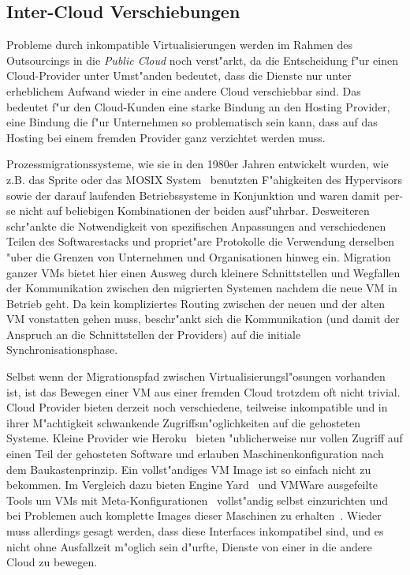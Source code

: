 \documentclass[draft,journal]{IEEEtran}
\begin{document}
\subsection{Inter-Cloud Verschiebungen}
\label{sec:movclouds}
Probleme durch inkompatible Virtualisierungen werden im Rahmen des
Outsourcings in die \emph{Public Cloud} noch verst"arkt, da die
Entscheidung f"ur einen Cloud-Provider unter Umst"anden bedeutet, dass
die Dienste nur unter erheblichem Aufwand wieder in eine andere Cloud
verschiebbar sind. Das bedeutet f"ur den Cloud-Kunden eine starke
Bindung an den Hosting Provider, eine Bindung die f"ur Unternehmen so
problematisch sein kann, dass auf das Hosting bei einem fremden
Provider ganz verzichtet werden muss.

Prozessmigrationssysteme, wie sie in den 1980er Jahren entwickelt
wurden, wie z.B. das Sprite oder das MOSIX
System~\cite{hansen2004self} benutzten F"ahigkeiten des Hypervisors
sowie der darauf laufenden Betriebssysteme in Konjunktion und waren
damit per-se nicht auf beliebigen Kombinationen der beiden
ausf"uhrbar. Desweiteren schr"ankte die Notwendigkeit von spezifischen
Anpassungen and verschiedenen Teilen des Softwarestacks und
propriet"are Protokolle die Verwendung derselben "uber die Grenzen von
Unternehmen und Organisationen hinweg ein. Migration ganzer VMs bietet
hier einen Ausweg durch kleinere Schnittstellen und Wegfallen der
Kommunikation zwischen den migrierten Systemen nachdem die neue VM in
Betrieb geht. Da kein kompliziertes Routing zwischen der neuen und der
alten VM vonstatten gehen muss, beschr"ankt sich die Kommunikation
(und damit der Anspruch an die Schnittstellen der Providers) auf die
initiale Synchronisationsphase.

Selbst wenn der Migrationspfad zwischen Virtualisierungsl"osungen
vorhanden ist, ist das Bewegen einer VM aus einer fremden Cloud
trotzdem oft nicht trivial. Cloud Provider bieten derzeit noch
verschiedene, teilweise inkompatible und in ihrer M"achtigkeit
schwankende Zugriffsm"oglichkeiten auf die gehosteten Systeme. Kleine
Provider wie Heroku~\cite{none} bieten "ublicherweise nur vollen
Zugriff auf einen Teil der gehosteten Software und erlauben
Maschinenkonfiguration nach dem Baukastenprinzip. Ein vollst"andiges
VM Image ist so einfach nicht zu bekommen. Im Vergleich dazu bieten
Engine Yard~\cite{none} und VMWare ausgefeilte Tools um VMs mit
Meta-Konfigurationen~\cite{none} vollst"andig selbst einzurichten und
bei Problemen auch komplette Images dieser Maschinen zu
erhalten~\cite{none}. Wieder muss allerdings gesagt werden, dass diese
Interfaces inkompatibel sind, und es nicht ohne Ausfallzeit m"oglich
sein d"urfte, Dienste von einer in
die andere Cloud zu bewegen.\\
\end{document}
